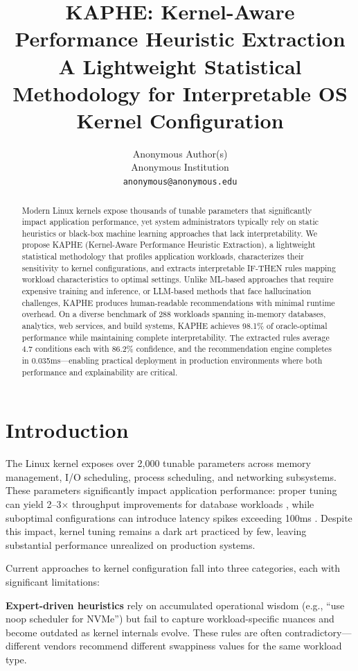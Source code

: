 \documentclass[11pt,a4paper]{article}
\title{KAPHE: Kernel-Aware Performance Heuristic Extraction\\
\vspace{0.2em}
\large A Lightweight Statistical Methodology for Interpretable OS Kernel Configuration}
\author{%
Anonymous Author(s)\\
Anonymous Institution\\
\texttt{anonymous@anonymous.edu}
}
\begin{document}
\maketitle

\begin{abstract}
Modern Linux kernels expose thousands of tunable parameters that significantly impact application performance, yet system administrators typically rely on static heuristics or black-box machine learning approaches that lack interpretability. We propose KAPHE (Kernel-Aware Performance Heuristic Extraction), a lightweight statistical methodology that profiles application workloads, characterizes their sensitivity to kernel configurations, and extracts interpretable IF-THEN rules mapping workload characteristics to optimal settings. Unlike ML-based approaches that require expensive training and inference, or LLM-based methods that face hallucination challenges, KAPHE produces human-readable recommendations with minimal runtime overhead. On a diverse benchmark of 288 workloads spanning in-memory databases, analytics, web services, and build systems, KAPHE achieves 98.1\% of oracle-optimal performance while maintaining complete interpretability. The extracted rules average 4.7 conditions each with 86.2\% confidence, and the recommendation engine completes in 0.035ms---enabling practical deployment in production environments where both performance and explainability are critical.
\end{abstract}

\section{Introduction}
\label{sec:intro}

The Linux kernel exposes over 2,000 tunable parameters across memory management, I/O scheduling, process scheduling, and networking subsystems. These parameters significantly impact application performance: proper tuning can yield 2--3$\times$ throughput improvements for database workloads \citep{matias2015experimental}, while suboptimal configurations can introduce latency spikes exceeding 100ms \citep{wang2025mixture}. Despite this impact, kernel tuning remains a dark art practiced by few, leaving substantial performance unrealized on production systems.

Current approaches to kernel configuration fall into three categories, each with significant limitations:

\textbf{Expert-driven heuristics} rely on accumulated operational wisdom (e.g., ``use noop scheduler for NVMe'') but fail to capture workload-specific nuances and become outdated as kernel internals evolve. These rules are often contradictory---different vendors recommend different swappiness values for the same workload type.
\end{document}
